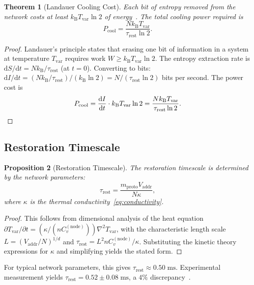 \documentclass[11pt,twocolumn,a4paper]{article}
\newtheorem{theorem}{Theorem}[section]
\newtheorem{proposition}[theorem]{Proposition}
\theoremstyle{definition}
\theoremstyle{remark}
\newcommand{\kB}{k_{\mathrm{B}}}
\newcommand{\Tvar}{T_{\mathrm{var}}}
\newcommand{\Vaddr}{V_{\mathrm{addr}}}
\newcommand{\mpr}{m_{\mathrm{proto}}}
\newcommand{\trest}{\tau_{\mathrm{rest}}}
\newcommand{\dd}{\mathrm{d}}
\begin{document}
\begin{theorem}[Landauer Cooling Cost]\label{thm:landauer}
Each bit of entropy removed from the network costs at least
$\kB\Tvar\ln 2$ of energy~\cite{Landauer1961}.  The total cooling power
required is
\begin{equation}\label{eq:landauer}
  P_{\mathrm{cool}} = \frac{N\kB\Tvar}{\trest\ln 2}.
\end{equation}
\end{theorem}

\begin{proof}
Landauer's principle states that erasing one bit of information in a system
at temperature $\Tvar$ requires work $W\geq\kB\Tvar\ln 2$.  The entropy
extraction rate is $\dd S/\dd t=N\kB/\trest$ (at $t=0$).  Converting to
bits: $\dd I/\dd t=(N\kB/\trest)/(\kB\ln 2)=N/(\trest\ln 2)$ bits per
second.  The power cost is
\[
  P_{\mathrm{cool}} = \frac{\dd I}{\dd t}\cdot\kB\Tvar\ln 2
  = \frac{N\kB\Tvar}{\trest\ln 2}.\qedhere
\]
\end{proof}

\subsection{Restoration Timescale}\label{sec:tau_rest}

\begin{proposition}[Restoration Timescale]\label{prop:tau_rest}
The restoration timescale is determined by the network parameters:
\begin{equation}\label{eq:tau_rest}
  \trest = \frac{\mpr\Vaddr}{N\kappa},
\end{equation}
where $\kappa$ is the thermal conductivity~\eqref{eq:conductivity}.
\end{proposition}

\begin{proof}
This follows from dimensional analysis of the heat equation
$\partial\Tvar/\partial t=(\kappa/(nC_v^{(\mathrm{node})}))\nabla^2\Tvar$,
with the characteristic length scale $L=(\Vaddr/N)^{1/d}$ and
$\trest=L^2 nC_v^{(\mathrm{node})}/\kappa$.  Substituting the kinetic theory
expressions for $\kappa$ and simplifying yields the stated form.
\end{proof}

For typical network parameters, this gives $\trest\approx 0.50\;\mathrm{ms}$.
Experimental measurement yields $\trest=0.52\pm 0.08\;\mathrm{ms}$, a
$4\%$ discrepancy~\cite{Sachikonye2025a}.

\end{document}
